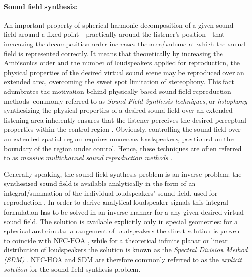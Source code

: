 \paragraph{Sound field synthesis:}
An important property of spherical harmonic decomposition of a given sound field around a fixed point---practically around the listener's position---that increasing the decomposition order increases the area/volume at which the sound field is represented correctly.
It means that theoretically by increasing the Ambisonics order and the number of loudspeakers applied for reproduction, the physical properties of the desired virtual sound scene may be reproduced over an extended area, overcoming the sweet spot limitation of stereophony.
This fact adumbrates the motivation behind physically based sound field reproduction methods, commonly referred to as \emph{Sound Field Synthesis techniques}, or \emph{holophony} synthesizing the physical properties of a desired sound field over an extended listening area inherently ensures that the listener perceives the desired perceptual properties within the control region \cite{Spors2013:Survey}.
Obviously, controlling the sound field over an extended spatial region requires numerous loudspeakers, positioned on the boundary of the region under control.
Hence, these techniques are often referred to as \emph{massive multichannel sound reproduction methods} \cite{Spors2013:Survey, Zhang2017}.

Generally speaking, the sound field synthesis problem is an inverse problem: the synthesized sound field is available analytically in the form of an integral/summation of the individual loudspeakers' sound field, used for reproduction \cite{Ahrens2010phd, Ahrens2012, fazi2008surround, Fazi2010}.
In order to derive analytical loudspeaker signals this integral formulation has to be solved in an inverse manner for a any given desired virtual sound field.
The solution is available explicitly only in special geometries: for a spherical and circular arrangement of loudspeakers the direct solution is proven to coincide with NFC-HOA \cite{Daniel2003, fazi2008surround, Fazi2010, poletti2005three, 943347, Ahrens2008:Analytical_Circ_Spherical_SFS, Ahrens2011:icassp}, while for a theoretical infinite planar or linear distribution of loudspeakers the solution is known as the \emph{Spectral Division Method (SDM)} \cite{Ahrens2010a, Ahrens2012:Ambisonics_for_planar_linear, Ahrens2012}.
NFC-HOA and SDM are therefore commonly referred to as the \emph{explicit solution} for the sound field synthesis problem.

